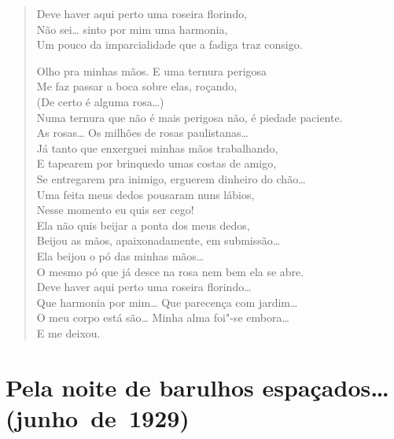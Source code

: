 \begin{verse}
Deve haver aqui perto uma roseira florindo,\\
Não sei\ldots{} sinto por mim uma harmonia,\\
Um pouco da imparcialidade que a fadiga traz consigo.

Olho pra minhas mãos. E uma ternura perigosa\\
Me faz passar a boca sobre elas, roçando,\\
(De certo é alguma rosa\ldots{})\\
Numa ternura que não é mais perigosa não, é piedade paciente.\\
As rosas\ldots{} Os milhões de rosas paulistanas\ldots{}\\
Já tanto que enxerguei minhas mãos trabalhando,\\
E tapearem por brinquedo umas costas de amigo,\\
Se entregarem pra inimigo, erguerem dinheiro do chão\ldots{}\\
Uma feita meus dedos pousaram nuns lábios,\\
Nesse momento eu quis ser cego!\\
Ela não quis beijar a ponta dos meus dedos,\\
Beijou as mãos, apaixonadamente, em submissão\ldots{}\\
Ela beijou o pó das minhas mãos\ldots{}\\
O mesmo pó que já desce na rosa nem bem ela se abre.\\
Deve haver aqui perto uma roseira florindo\ldots{}\\
Que harmonia por mim\ldots{} Que parecença com jardim\ldots{}\\
O meu corpo está são\ldots{} Minha alma foi"-se embora\ldots{}\\
E me deixou.
\end{verse}

\pagebreak
{}
\section*{Pela noite de barulhos espaçados\ldots{}\break (junho~de~1929)}

